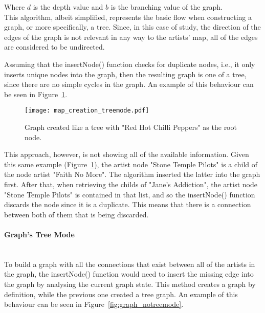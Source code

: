       Where $d$ is the depth value and $b$ is the branching value of the graph. \\

      This algorithm, albeit simplified, represents the basic flow when constructing a graph, or more specifically, a tree.
      Since, in this case of study, the direction of the edges of the graph is not relevant in any way to the artists' map, all of the edges are considered to be undirected.

      Assuming that the insertNode() function checks for duplicate nodes, i.e., it only inserts unique nodes into the graph, then the resulting graph is one of a tree, since there are no simple cycles in the graph.
      An example of this behaviour can be seen in Figure~\ref{fig:graph_treemode}.

      \begin{figure}[ht]
        \begin{center}
          \texttt{[image: map\_creation\_treemode.pdf]}
        \end{center}
        \caption{Graph created like a tree with "Red Hot Chilli Peppers" as the root node.}
        \label{fig:graph_treemode}
      \end{figure}

      This approach, however, is not showing all of the available information.
      Given this same example (Figure~\ref{fig:graph_treemode}), the artist node "Stone Temple Pilots" is a child of the node artist "Faith No More".
      The algorithm inserted the latter into the graph first.
      After that, when retrieving the childs of "Jane's Addiction", the artist node "Stone Temple Pilots" is contained in that list, and so the insertNode() function discards the node since it is a duplicate.
      This means that there is a connection between both of them that is being discarded.

      \paragraph{Graph's Tree Mode} \hfill \\
      To build a graph with all the connections that exist between all of the artists in the graph, the insertNode() function would need to insert the missing edge into the graph by analysing the current graph state.
      This method creates a graph by definition, while the previous one created a tree graph.
      An example of this behaviour can be seen in Figure~\ref{fig:graph_notreemode}.

